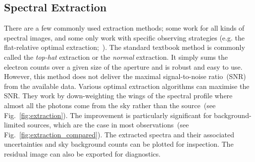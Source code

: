 \documentclass[linenumbers, twocolumn]{aastex631}
\begin{document}
\subsection{Spectral Extraction}
\label{sec:extract}
There are a few commonly used extraction methods; some work for all kinds of
spectral images, and some only work with specific observing strategies (e.g. the
flat-relative optimal extraction;~\citealt{2014A&A...561A..59Z}). The standard
textbook method is commonly called the \textit{top-hat} extraction or the
\textit{normal} extraction. It simply sums the electron counts over a given size
of the aperture and is robust and easy to use. However, this method does not
deliver the maximal signal-to-noise ratio~(SNR) from the available data. Various
optimal extraction algorithms can maximise the SNR. They work by down-weighting
the wings of the spectral profile where almost all the photons come from the sky
rather than the source~(see Fig.~\ref{fig:extraction}). The improvement is
particularly significant for background-limited sources, which are the case in
most observations~(see Fig.~\ref{fig:extraction_compared}). The extracted
spectra and their associated uncertainties and sky background counts can be
plotted for inspection. The residual image can also be exported for diagnostics.
\end{document}
